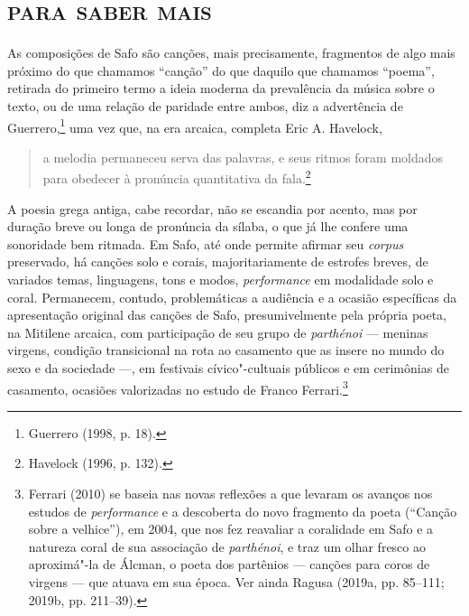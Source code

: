 \part{\textsc{para saber mais}}


\noindent{}As composições de Safo são canções, mais
precisamente, fragmentos de algo mais próximo do que chamamos “canção” do que
daquilo que chamamos “poema”, retirada do primeiro termo a ideia moderna da
prevalência da música sobre o texto, ou de uma relação de paridade entre ambos,
diz a advertência de Guerrero,\footnote{ Guerrero (1998, p. 18).} uma vez que, na era arcaica, completa Eric A. Havelock, 

\begin{quote}
a melodia permaneceu serva
das palavras, e seus ritmos foram moldados para obedecer à pronúncia
quantitativa da fala.\footnote{ Havelock (1996, p. 132).}
\end{quote}

 A poesia grega antiga, cabe recordar, não se
escandia por acento, mas por duração breve ou longa de pronúncia da sílaba, o
que já lhe confere uma sonoridade bem ritmada. Em Safo, até onde permite
afirmar seu \textit{corpus} preservado,
há canções solo e corais, majoritariamente de estrofes breves, de variados temas,
linguagens, tons e modos, \textit{performance} em modalidade solo e coral.
Permanecem, contudo, problemáticas a
audiência e a ocasião específicas da apresentação original das canções
de Safo, presumivelmente pela própria poeta, na Mitilene arcaica, com participação de seu grupo de \textit{parthénoi} --- meninas virgens, condição transicional na rota ao casamento que as insere no mundo do sexo e da sociedade ---, em festivais cívico"-cultuais públicos e em cerimônias de casamento, ocasiões valorizadas no estudo de Franco Ferrari.\footnote{Ferrari (2010) se baseia nas novas reflexões a que levaram os avanços nos estudos de \textit{performance} e a descoberta do novo fragmento da poeta (``Canção sobre a velhice''), em 2004, que nos fez reavaliar a coralidade em Safo e a natureza coral de sua associação de \textit{parthénoi}, e traz um olhar fresco ao aproximá"-la de Álcman, o poeta dos partênios --- canções para coros de virgens --- que atuava em sua época. Ver ainda Ragusa (2019a, pp. 85--111; 2019b, pp. 211--39).}

